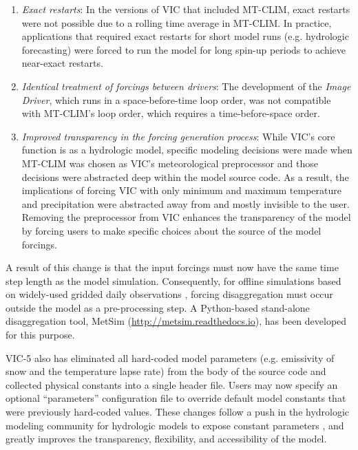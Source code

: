 \documentclass[gmd, manuscript]{copernicus}
\begin{document}
    \begin{enumerate}
      \item \textit{Exact restarts}: In the versions of VIC that included MT-CLIM, exact restarts were not possible due to a rolling time average in MT-CLIM. In practice, applications that required exact restarts for short model runs (e.g. hydrologic forecasting) were forced to run the model for long spin-up periods to achieve near-exact restarts.
      \item \textit{Identical treatment of forcings between drivers}: The development of the \textit{Image Driver}, which runs in a space-before-time loop order, was not compatible with MT-CLIM's loop order, which requires a time-before-space order.
      \item \textit{Improved transparency in the forcing generation process}: While VIC's core function is as a hydrologic model, specific modeling decisions were made when MT-CLIM was chosen as VIC's meteorological preprocessor and those decisions were abstracted deep within the model source code. As a result, the implications of forcing VIC with only minimum and maximum temperature and precipitation were abstracted away from and mostly invisible to the user. Removing the preprocessor from VIC enhances the transparency of the model by forcing users to make specific choices about the source of the model forcings.
    \end{enumerate}

    A result of this change is that the input forcings must now have the same time step length as the model simulation.  Consequently, for offline simulations based on widely-used gridded daily observations \citep[e.g.][]{Livneh_2015}, forcing disaggregation must occur outside the model as a pre-processing step.  A Python-based stand-alone disaggregation tool, MetSim (\url{http://metsim.readthedocs.io}), has been developed for this purpose.

    VIC-5 also has eliminated all hard-coded model parameters (e.g. emissivity of snow and the temperature lapse rate) from the body of the source code and collected physical constants into a single header file. Users may now specify an optional ``parameters'' configuration file to override default model constants that were previously hard-coded values. These changes follow a push in the hydrologic modeling community for hydrologic models to expose constant parameters \citep[e.g.][]{Mendoza_2015}, and greatly improves the transparency, flexibility, and accessibility of the model.
\end{document}
